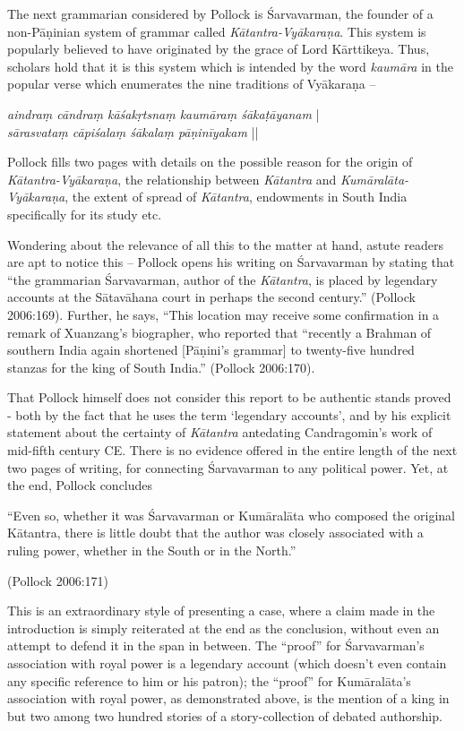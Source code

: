 The next grammarian considered by Pollock is Śarvavarman, the founder of a non-Pāṇinian system of grammar called {\sl Kātantra-Vyākaraṇa}. This system is popularly believed to have originated by the grace of Lord Kārttikeya. Thus, scholars hold that it is this system which is intended by the word {\sl kaumāra} in the popular verse which enumerates the nine traditions of Vyākaraṇa --
\begin{myquote}
{{\sl aindraṃ cāndraṃ kāśakṛtsnaṃ kaumāraṃ śākaṭāyanam}} |\\ 
{{\sl sārasvataṃ cāpiśalaṃ śākalaṃ pāṇinīyakam}} || 
\end{myquote}
Pollock fills two pages with details on the possible reason for the origin of {\sl Kātantra-Vyākaraṇa}, the relationship between {\sl Kātantra} and {\sl Kumāralāta-Vyākaraṇa}, the extent of spread of {\sl Kātantra}, endowments in South India specifically for its study etc. 

Wondering about the relevance of all this to the matter at hand, astute readers are apt to notice this -- Pollock opens his writing on Śarvavarman by stating that ``the grammarian Śarvavarman, author of the {\sl Kātantra}, is placed by legendary accounts at the Sātavāhana court in perhaps the second century.'' (Pollock 2006:169). Further, he says, ``This location may receive some confirmation in a remark of Xuanzang's biographer, who reported that ``recently a Brahman of southern India again shortened [Pāṇini’s grammar] to twenty-five hundred stanzas for the king of South India.'' (Pollock 2006:170). 

That Pollock himself does not consider this report to be authentic stands proved - both by the fact that he uses the term `legendary accounts', and by his explicit statement about the certainty of {\sl Kātantra} antedating Candragomin's work of mid-fifth century CE. There is no evidence offered in the entire length of the next two pages of writing, for connecting Śarvavarman to any political power. Yet, at the end, Pollock concludes 

\newpage

\begin{myquote}
``Even so, whether it was Śarvavarman or Kumāralāta who composed the original Kātantra, there is little doubt that the author was closely associated with a ruling power, whether in the South or in the North.''

\hfill (Pollock 2006:171) 
\end{myquote}
This is an extraordinary style  of presenting a case, where a claim made in the introduction is simply reiterated at the end as the conclusion, without even an attempt to defend it in the span in between. The ``proof'' for Śarvavarman’s association with royal power is a legendary account (which doesn't even contain any specific reference to him or his patron); the ``proof'' for Kumāralāta's association with royal power, as demonstrated above, is the mention of a king in but two among two hundred stories of a story-collection of debated authorship. 

